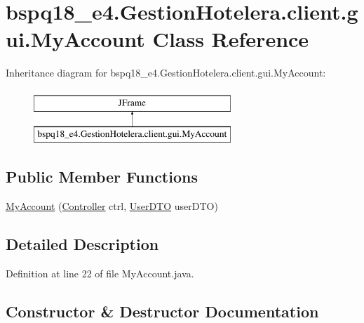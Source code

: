 \hypertarget{classbspq18__e4_1_1_gestion_hotelera_1_1client_1_1gui_1_1_my_account}{}\section{bspq18\+\_\+e4.\+Gestion\+Hotelera.\+client.\+gui.\+My\+Account Class Reference}
\label{classbspq18__e4_1_1_gestion_hotelera_1_1client_1_1gui_1_1_my_account}
Inheritance diagram for bspq18\+\_\+e4.\+Gestion\+Hotelera.\+client.\+gui.\+My\+Account\+:\begin{figure}[H]
\begin{center}
\leavevmode
\includegraphics[height=2.000000cm]{classbspq18__e4_1_1_gestion_hotelera_1_1client_1_1gui_1_1_my_account}
\end{center}
\end{figure}
\subsection*{Public Member Functions}
\begin{DoxyCompactItemize}
\item 
\mbox{\hyperlink{classbspq18__e4_1_1_gestion_hotelera_1_1client_1_1gui_1_1_my_account_ac4fff67a050b9d754bf8eff5dbf181cb}{My\+Account}} (\mbox{\hyperlink{classbspq18__e4_1_1_gestion_hotelera_1_1client_1_1controller_1_1_controller}{Controller}} ctrl, \mbox{\hyperlink{classbspq18__e4_1_1_gestion_hotelera_1_1server_1_1dto_1_1_user_d_t_o}{User\+D\+TO}} user\+D\+TO)
\end{DoxyCompactItemize}


\subsection{Detailed Description}


Definition at line 22 of file My\+Account.\+java.



\subsection{Constructor \& Destructor Documentation}
\mbox{\label{classbspq18__e4_1_1_gestion_hotelera_1_1client_1_1gui_1_1_my_account_ac4fff67a050b9d754bf8eff5dbf181cb}} 
